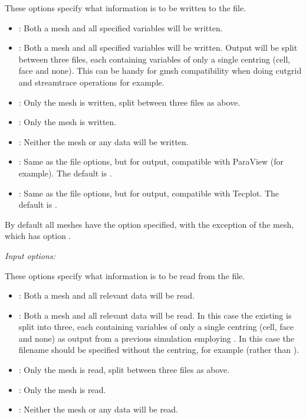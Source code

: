 These options specify what information is to be written to the  file.
\begin{itemize}
\item {}:  Both a mesh and all specified variables will be written.
\item {}:  Both a mesh and all specified variables will be written.  Output will be split between three files, each containing variables of only a single centring (cell, face and none).  This can be handy for gmsh compatibility when doing cutgrid and streamtrace operations for example.
\item {}:  Only the mesh is written, split between three files as above.
\item {}:  Only the mesh is written.
\item {}:  Neither the mesh or any data will be written.
\item {}:  Same as the  file options, but for  output, compatible with ParaView (for example).  The default is .
\item {}:  Same as the  file options, but for  output, compatible with Tecplot.  The default is .
\end{itemize}

By default all meshes have the  option specified, with the exception of the  mesh, which has option .

\emph{Input options:}

These options specify what information is to be read from the  file.
\begin{itemize}
\item {}:  Both a mesh and all relevant data will be read.
\item {}:  Both a mesh and all relevant data will be read.  In this case the existing  is split into three, each containing variables of only a single centring (cell, face and none) as output from a previous simulation employing .  In this case the filename should be specified without the centring, for example  (rather than ).
\item {}:  Only the mesh is read, split between three files as above.
\item {}:  Only the mesh is read.
\item {}:  Neither the mesh or any data will be read.
\end{itemize}

